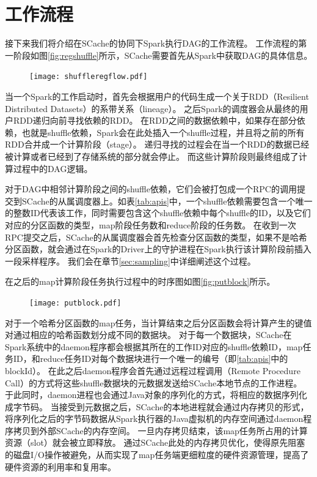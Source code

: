 \section{工作流程}

接下来我们将介绍在SCache的协同下Spark执行DAG的工作流程。
工作流程的第一阶段如图\ref{fig:regshuffle}所示，SCache需要首先从Spark中获取DAG的具体信息。

\begin{figure}[!htp]
	\centering
	\texttt{[image: shuffleregflow.pdf]}
\end{figure}

当一个Spark的工作启动时，首先会根据用户的代码生成一个关于RDD（Resilient Distributed Datasets）的系带关系（lineage）。
之后Spark的调度器会从最终的用户RDD递归向前寻找依赖的RDD。
在RDD之间的数据依赖中，如果存在部分依赖，也就是shuffle依赖，Spark会在此处插入一个shuffle过程，并且将之前的所有RDD合并成一个计算阶段（stage）。
递归寻找的过程会在当一个RDD的数据已经被计算或者已经到了存储系统的部分就会停止。
而这些计算阶段则最终组成了计算过程中的DAG逻辑。

对于DAG中相邻计算阶段之间的shuffle依赖，它们会被打包成一个RPC的调用提交到SCache的从属调度器上。如表\ref{tab:apis}中，一个shuffle依赖需要包含一个唯一的整数ID代表该工作，同时需要包含这个shuffle依赖中每个shuffle的ID，以及它们对应的分区函数的类型，map阶段任务数和reduce阶段的任务数。
在收到一次RPC提交之后，SCache的从属调度器会首先检查分区函数的类型，如果不是哈希分区函数，就会通过在Spark的Driver上的守护进程在Spark执行该计算阶段前插入一段采样程序。
我们会在章节\ref{sec:sampling}中详细阐述这个过程。

在之后的map计算阶段任务执行过程中的时序图如图\ref{fig:putblock}所示。

\begin{figure}[!htp]
	\centering
	\texttt{[image: putblock.pdf]}
\end{figure}

对于一个哈希分区函数的map任务，当计算结束之后分区函数会将计算产生的键值对通过相应的哈希函数划分成不同的数据块。
对于每一个数据块，SCache在Spark系统中的daemon程序都会根据其所在的工作ID对应的shuffle依赖ID，map任务ID，和reduce任务ID对每个数据块进行一个唯一的编号（即\ref{tab:apis}中的blockId）。
在此之后daemon程序会首先通过远程过程调用（Remote Procedure Call）的方式将这些shuffle数据块的元数据发送给SCache本地节点的工作进程。
于此同时，daemon进程也会通过Java对象的序列化的方式，将相应的数据序列化成字节码。
当接受到元数据之后，SCache的本地进程就会通过内存拷贝的形式，将序列化之后的字节码数据从Spark执行器的Java虚拟机的内存空间通过daemon程序拷贝到外部SCache的内存空间。
一旦内存拷贝结束，该map任务所占用的计算资源（slot）就会被立即释放。
通过SCache此处的内存拷贝优化，使得原先阻塞的磁盘I/O操作被避免，从而实现了map任务端更细粒度的硬件资源管理，提高了硬件资源的利用率和复用率。


